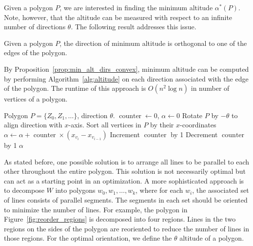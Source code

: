 \documentclass[../main.tex]{subfiles}
\begin{document}
Given a polygon $P$, we are interested in finding the minimum altitude $\alpha^*(P)$.  Note, however, that the altitude can be measured with respect to an infinite number of directions $\theta$. The following result addresses this issue.
\begin{proposition}
\label{prop:min_alt_dirs_convex}
Given a polygon $P$, the direction of minimum altitude is orthogonal to one of the edges of the polygon. 
\end{proposition}
By Proposition~\ref{prop:min_alt_dirs_convex}, minimum altitude can be computed by performing Algorithm~\ref{alg:altitude} on each direction associated with the edge of the polygon. The runtime of this approach is $O(n^2\log n)$ in number of vertices of a polygon.

\begin{algorithm}
	\caption{$\operatorname{get\_general\_altitude}(P, \theta)$}
	\label{alg:altitude}
	\begin{algorithmic}[1]
		\REQUIRE Polygon $P=\{Z_0, Z_1,\ldots\}$, direction $\theta$.
			\STATE $\operatorname{counter}\gets 0$, $\alpha\gets 0$
			\STATE Rotate $P$ by $-\theta$ to align direction with $x$-axis.
			\STATE Sort all vertices in $P$ by their  $x$-coordinates
				\STATE $\alpha\gets \alpha+\operatorname{counter}\times(x_{v_{i}}-x_{v_{i-1}})$ 
					\STATE Increment $\operatorname{counter}$ by 1
					\STATE Decrement $\operatorname{counter}$ by 1
				\ENDIF
			\ENDFOR
			\RETURN $\alpha$
	\end{algorithmic}
\end{algorithm}


As stated before, one possible solution is to arrange all lines to be parallel to each other throughout the entire polygon. This solution is not necessarily optimal but can act as a starting point in an optimization. A more sophisticated approach is to decompose $W$ into polygons $w_0,w_1,\ldots,w_k$, where for each $w_i$, the associated set of lines consists of parallel segments. The segments in each set should be oriented to minimize the number of lines. For example, the polygon in Figure~\ref{fig:reorder_regions} is decomposed into four regions. Lines in the two regions on the sides of the polygon are reoriented to reduce the number of lines in those regions. For the optimal orientation, we define the $\theta$ altitude of a polygon.
\end{document}
